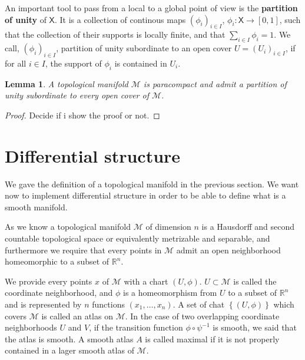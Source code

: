 \documentclass[10pt]{book}
\newcommand{\Mcal}{\mathcal{M}}
\newcommand{\Rbb}{\mathbb{R}}
\newcommand{\Xsf}{\mathsf{X}}
\theoremstyle{break}
\newtheorem{lemma}{Lemma}
\newtheorem{proof}{Proof}
\begin{document}
\bigskip


An important tool to pass from a local to a global point of view is the \textbf{partition of unity} of $\Xsf$. It is a collection of continous maps $(\phi_i)_{i \in I}$, $\phi_i : \Xsf \to [0,1]$, such that the collection of their supports is locally finite, and that $\sum_{i\in I} \phi_i = 1$. We call, $(\phi_i)_{i \in I}$, partition of unity subordinate to an open cover $U=(U_i)_{i \in I}$, if for all $i \in I$, the support of $\phi_i$ is contained in $U_i$.


\begin{lemma}
A topological manifold $\Mcal$ is paracompact and admit a partition of unity subordinate to every open cover of $\Mcal$.
\end{lemma}


\begin{proof}
Decide if i show the proof or not.
\end{proof}


\section{Differential structure}

We gave the definition of a topological manifold in the previous section. We want now to implement differential structure in order to be able to define what is a smooth manifold.

\vskip4pt

As we know a topological manifold $\Mcal$ of dimension $n$ is a Hausdorff and second countable topological space or equivalently metrizable and separable, and furthermore we require that every points in $\Mcal$ admit an open neighborhood homeomorphic to a subset of $\Rbb^n$. 

\vskip4pt

We provide every points $x$ of $\Mcal$ with a chart $(U,\phi)$. $U \subset \Mcal$ is called the coordinate neighborhood, and $\phi$ is a homeomorphism from $U$ to a subset of $\Rbb^n$ and is represented by $n$ functions $(x_1,\dots,x_n)$. A set of chat $\left\{ (U, \phi) \right\}$ which covers $\Mcal$ is called an atlas on $\Mcal$. In the case of two overlapping coordinate neighborhoods $U$ and $V$, if the transition function $\phi \circ \psi^{-1}$ is smooth, we said that the atlas is smooth. A smooth atlas $A$ is called maximal if it is not properly contained in a lager smooth atlas of $\Mcal$.
\end{document}
